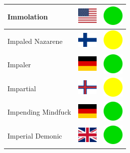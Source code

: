 \documentclass[12pt, a4paper, twoside]{report}
\begin{document}
\begin{center}
\begin{longtable}{|p{5cm}|p{2cm}|p{2cm}|}
 Immolation                                                 & \includegraphics[width=1cm]{../img/flags/us} &   \includegraphics[width=1cm]{../likes/y} \\ \hline
 Impaled Nazarene                                           & \includegraphics[width=1cm]{../img/flags/fi} &   \includegraphics[width=1cm]{../likes/m} \\ \hline
 Impaler                                                    & \includegraphics[width=1cm]{../img/flags/de} &   \includegraphics[width=1cm]{../likes/y} \\ \hline
 Impartial                                                  & \includegraphics[width=1cm]{../img/flags/fo} &   \includegraphics[width=1cm]{../likes/m} \\ \hline
 Impending Mindfuck                                         & \includegraphics[width=1cm]{../img/flags/de} &   \includegraphics[width=1cm]{../likes/y} \\ \hline
 Imperial Demonic                                           & \includegraphics[width=1cm]{../img/flags/gb} &   \includegraphics[width=1cm]{../likes/y} \\ \hline

\end{longtable}
\end{center}
\end{document}
